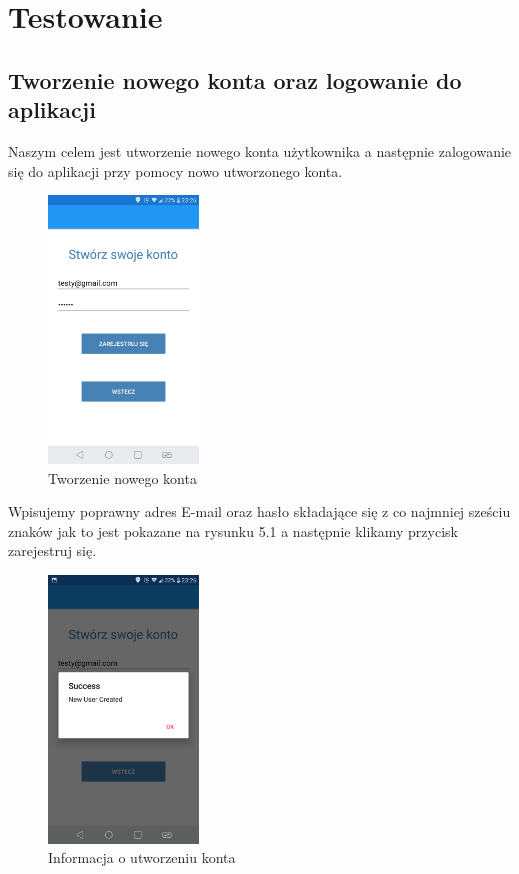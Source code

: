 	\newpage
\section{Testowanie}	%
\subsection{Tworzenie nowego konta oraz logowanie do aplikacji}

Naszym celem jest utworzenie nowego konta użytkownika a następnie zalogowanie się do aplikacji przy pomocy nowo utworzonego konta.

\begin{figure}[!htb]
	\begin{center}
		\includegraphics[width=4cm]{rys/ZZkonto.png}
		\caption{Tworzenie nowego konta}
		\label{rys:rysunek029}
	\end{center}
\end{figure}

Wpisujemy poprawny adres E-mail oraz hasło składające się z co najmniej sześciu znaków jak to jest pokazane na rysunku 5.1 a następnie klikamy przycisk zarejestruj się.

\begin{figure}[!htb]
	\begin{center}
		\includegraphics[width=4cm]{rys/ZZkonto2.png}
		\caption{Informacja o utworzeniu konta}
		\label{rys:rysunek030}
	\end{center}
\end{figure}

